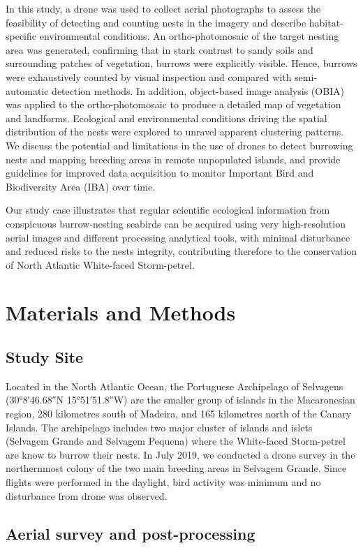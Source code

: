 \documentclass[12pt]{article}
\begin{document}
In this study, a drone was used to collect aerial photographs to assess the feasibility of detecting and counting nests in the imagery and describe habitat-specific environmental conditions. An ortho-photomosaic of the target nesting area was generated, confirming that in stark contrast to sandy soils and surrounding patches of vegetation, burrows were explicitly visible. Hence, burrows were exhaustively counted by visual inspection and compared with semi-automatic detection methods. In addition, object-based image analysis (OBIA) was applied to the ortho-photomosaic to produce a detailed map of vegetation and landforms. Ecological and environmental conditions driving the spatial distribution of the nests were explored to unravel apparent clustering patterns. We discuss the potential and limitations in the use of drones to detect burrowing nests and mapping breeding areas in remote unpopulated islands, and provide guidelines for improved data acquisition to monitor Important Bird and Biodiversity Area (IBA) over time. 

Our study case illustrates that regular scientific ecological information from conspicuous burrow-nesting seabirds can be acquired using very high-resolution aerial images and different processing analytical tools, with minimal disturbance and reduced risks to the nests integrity, contributing therefore to the conservation of North Atlantic White-faced Storm-petrel.

\section{Materials and Methods}
\subsection{Study Site}
Located in the North Atlantic Ocean, the Portuguese Archipelago of Selvagens (\ang{30;8;46.68}N \ang{15;51;51.8}W) are the smaller group of islands in the Macaronesian region, 280 kilometres  south of Madeira, and 165 kilometres north of  the Canary Islands. The archipelago includes two major cluster of islands and islets (Selvagem Grande and Selvagem Pequena) where the White-faced Storm-petrel are know to burrow their nests. In July 2019, we conducted a drone survey in the northernmost colony of the two main breeding areas in Selvagem Grande.  Since flights were performed in the daylight, bird activity was minimum and no disturbance from drone was observed.

\subsection{Aerial survey and post-processing}
\end{document}

